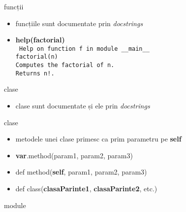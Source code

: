 \documentclass{beamer}
\begin{document}
\begin{frame}{funcții}
  \begin{itemize}
  \item funcțiile sunt documentate prin \textit{docstrings} \\
   \small 
  \item \textbf{help(factorial)}                            \\
    \texttt{
      Help on function f in module \_\_main\_\_\:           \\
      factorial(n)                                          \\
      Computes the factorial of n.                          \\
      Returns n!.
    }
  \end{itemize}
\end{frame}

\begin{frame}{clase}
  \begin{itemize}
  \item clase sunt documentate și ele prin \textit{docstrings} \\
    \small 
  \end{itemize}
\end{frame}

\begin{frame}{clase}
  \begin{itemize}
  \item metodele unei clase primesc ca prim parametru pe \textbf{self}
  \item \textbf{var}.method(param1, param2, param3)
  \item def method(\textbf{self}, param1, param2, param3)
  \item def class(\textbf{clasaParinte1}, \textbf{clasaParinte2}, etc.)
   \end{itemize}
\end{frame}


\begin{frame}{module}
  \begin{columns}[t]
    \begin{column}{4cm}
     \scriptsize {  }
      \end{column}
    \begin{column}{4cm}
      \scriptsize {  }
    \end{column}
  \end{columns}
\end{frame}
\end{document}
